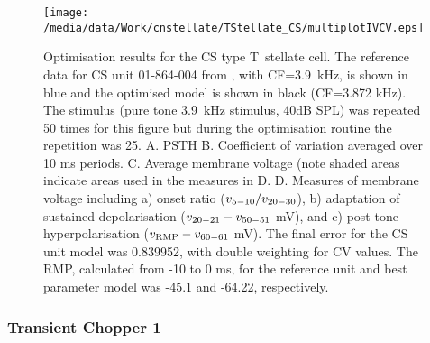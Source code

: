\begin{figure}[htb]
\centering%
\texttt{[image: /media/data/Work/cnstellate/TStellate\_CS/multiplotIVCV.eps]}
\caption[CS T~stellate Optimisation results]{Optimisation results for the CS type T~stellate cell.
The reference data for CS unit 01-864-004 from  \citep{PaoliniClareyEtAl:2005}, with CF=3.9~kHz, is shown in blue and the     optimised model is shown in black (CF=3.872 kHz).
The stimulus (pure tone  3.9~kHz stimulus, 40dB SPL)  was repeated 50 times for this figure but during the optimisation routine the  repetition was 25.
A. PSTH B. Coefficient of variation averaged over 10 ms periods.
C. Average membrane voltage (note shaded areas indicate areas used in the measures in D.
D. Measures of membrane voltage including a) onset ratio ($v_{\rm 5-10}/v_{\rm 20-30}$), b) adaptation of sustained depolarisation ($v_{\rm 20-21} - v_{\rm 50-51}$ mV), and c) post-tone hyperpolarisation ($v_{\rm RMP} - v_{\rm 60-61}$ mV).
The final error for the CS unit model was 0.839952, with double weighting for CV values.
The RMP, calculated from -10 to 0 ms, for the reference unit and best parameter model was -45.1 and -64.22, respectively.}
\label{fig:CSresults}
\end{figure}




\clearpage
\subsubsection{Transient Chopper 1}

